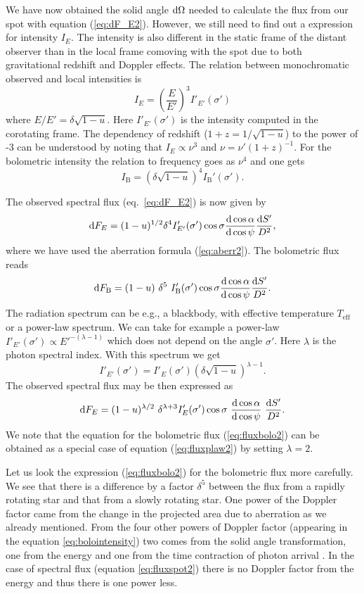 \documentclass{wihuri}
\def\be{\begin{equation}}
\def\ee{\end{equation}}
\def\d{{\rm d}}
\def\Dop{\delta}
\def\bolo{\mathrm{B}}
\def\ene{E}%
\begin{document}
We have now obtained the solid angle $\d\Omega$ needed to calculate the flux from our spot with equation (\ref{eq:dF_E2}). However, we still need to find out a expression for intensity $I_{\ene}$. The intensity is also different in the static frame of the distant observer than in the local frame comoving with the spot due to both gravitational redshift and Doppler effects. The relation between monochromatic observed and local intensities is \cite{mtw}\cite{rybicki}%
\be
I_{\ene} = \left (\frac{E}{E'}\right )^3 I'_{\ene'} (\sigma')
\ee
where $E/E'=\Dop \sqrt{1-u}$. Here $I'_{\ene'}(\sigma')$ is the intensity computed in the corotating frame. The dependency of redshift ($1+z = 1/\sqrt{1-u}$) to the power of -3 can be understood by noting that $I_{\ene} \propto \nu^{3}$ and $\nu = \nu'(1+z)^{-1}$.
For the bolometric intensity the relation to frequency goes as $\nu^{4}$ and one gets
\be \label{eq:bolointensity}
I_{\bolo}= \left (\Dop \sqrt{1-u} \right )^4 I_{\bolo}'(\sigma') .
\ee

The observed spectral flux (eq.~\ref{eq:dF_E2}) is now given by
\be \label{eq:fluxspot2}
\d F_{\ene}=(1-u)^{1/2} \Dop^{4} I'_{\ene'}(\sigma') \cos\sigma
\frac{\d \cos\alpha}{\d\cos\psi}
 \frac{\d S'}{D^2} ,
\ee
where we have used the aberration formula (\ref{eq:aberr2}).
The bolometric flux reads
\be  \label{eq:fluxbolo2}
\d F_{\bolo}= (1-u)\ \Dop^5 \
I_{\bolo}'(\sigma')  \cos\sigma \frac{\d\cos\alpha}{\d\cos\psi} \frac{\d S'}{D^2} .
\ee
The radiation spectrum can be e.g., a blackbody, with effective temperature $T_{\mathrm{eff}}$ or a power-law spectrum. We can take for example a power-law $I'_{\ene'}(\sigma') \propto E '^{-(\lambda-1)}$ which does not depend on the angle $\sigma'$. Here $\lambda$ is the photon spectral index. With this spectrum we get
\be \label{eq:int_trans2}
I'_{\ene'}(\sigma') = I'_{\ene}(\sigma')
\left( \Dop \sqrt{1-u} \right)^{\lambda-1} .
\ee
The observed spectral flux %
may be then expressed as
\be\label{eq:fluxplaw2}
\d F_{\ene}= (1-u)^{\lambda/2}\ \Dop^{\lambda+3} I'_{\ene}(\sigma')
\cos\sigma\ \frac{\d\cos\alpha}{\d\cos\psi}\ \frac{\d S'}{D^2}.
\ee
We note that the equation for the bolometric flux (\ref{eq:fluxbolo2})
can be obtained as a special case of equation (\ref{eq:fluxplaw2}) by setting $\lambda=2$. 

Let us look the expression (\ref{eq:fluxbolo2}) for the bolometric flux more carefully. We see that there is a difference by a factor $\Dop^5$ between the flux from a rapidly rotating star and that from a slowly rotating star. One power of the Doppler factor came from the change in the projected area due to aberration as we already mentioned. From the four other powers of Doppler factor (appearing in the equation \ref{eq:bolointensity}) two comes from the solid angle transformation, one from the energy and one from the time contraction of photon arrival \cite{rybicki}. %
In the case of spectral flux (equation \ref{eq:fluxspot2}) there is no Doppler factor from the energy and thus there is one power less.
\end{document}
